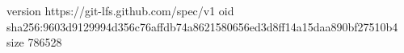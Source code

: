 version https://git-lfs.github.com/spec/v1
oid sha256:9603d9129994d356c76affdb74a8621580656ed3d8ff14a15daa890bf27510b4
size 786528
